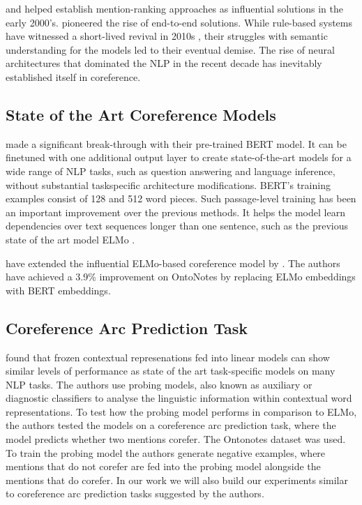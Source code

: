 \documentclass[11pt]{article}
\begin{document}
\textcite{yang2003coref} and \textcite{iida2003incorporating} helped establish mention-ranking approaches as influential solutions in the early 2000's. \textcite{ng2005b} pioneered the rise of end-to-end solutions. While rule-based systems have witnessed a short-lived revival in 2010s \parencite{zhou2004, haghighi2009}, their struggles with semantic understanding for the models led to their eventual demise.  The rise of neural architectures that dominated the NLP in the recent decade has inevitably established itself in coreference. 

\subsection{State of the Art Coreference Models}


\textcite{devlin2019bert} made a significant break-through with their pre-trained BERT model. It can be finetuned with one additional output layer
to create state-of-the-art models for a wide
range of NLP tasks, such as question answering and language inference, without substantial taskspecific architecture modifications. BERT's training examples consist of 128 and 512 word pieces. Such passage-level training has been an important improvement over the previous methods. It helps the model learn dependencies over text sequences longer than one sentence, such as the previous state of the art model ELMo \parencite{peters2018elmo}.

\textcite{devlin2019bert} have extended the influential ELMo-based coreference model by \textcite{lee2018higher}. The authors have achieved a 3.9\% improvement on OntoNotes by replacing ELMo embeddings with BERT embeddings. 

\subsection{Coreference Arc Prediction Task}

 \textcite{liu2019linguistic} found that frozen contextual represenations fed into linear models can show similar levels of performance as state of the art task-specific models on many NLP tasks. The authors use probing models, also known as auxiliary or diagnostic classifiers \parencite{shi2016string, kadar2017representation} to analyse the linguistic information within contextual word representations. To test how the probing model performs in comparison to ELMo, the authors tested the models on a coreference arc prediction task, where the model predicts whether two mentions corefer. The Ontonotes dataset was used. To train the probing model the authors generate negative examples, where mentions that do not corefer are fed into the probing model alongside the mentions that do corefer. In our work we will also build our experiments similar to coreference arc prediction tasks suggested by the authors.
\end{document}
